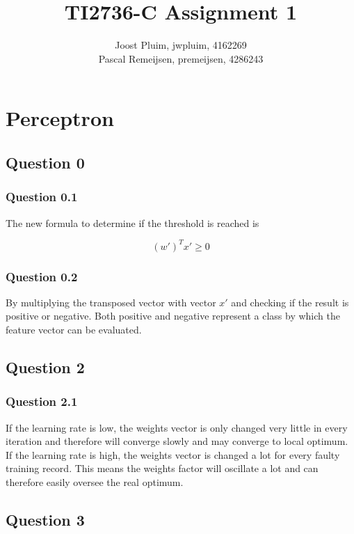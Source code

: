 \documentclass[11pt,twoside,a4paper]{article}
\title{TI2736-C Assignment 1}
\author{
	Joost Pluim, jwpluim, 4162269 \\
	Pascal Remeijsen, premeijsen, 4286243
}
\begin{document}
\maketitle
\clearpage

\chapter{Perceptron}

\section{Question 0}
	
	\subsection{Question 0.1}
	The new formula to determine if the threshold is reached is
	
	\begin{equation}
		(w')^T x' \geq 0
	\end{equation}
	
	\subsection{Question 0.2}
	By multiplying the transposed vector with vector $x'$ and checking if the result is positive or negative. Both positive and negative represent a class by which the feature vector can be evaluated. 
				
\section{Question 2}

	\subsection{Question 2.1}
	If the learning rate is low, the weights vector is only changed very little in every iteration and therefore will converge slowly and may converge to local optimum.\\
	If the learning rate is high, the weights vector is changed a lot for every faulty training record. This means the weights factor will oscillate a lot and can therefore easily oversee the real optimum.
	
\section{Question 3}
\end{document}
